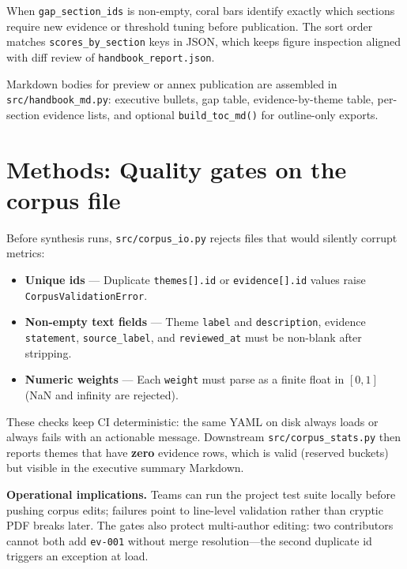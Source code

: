 \documentclass[
]{article}
\providecommand{\tightlist}{%
  \setlength{\itemsep}{0pt}\setlength{\parskip}{0pt}}
\begin{document}
When \texttt{gap\_section\_ids} is non-empty, coral bars identify
exactly which sections require new evidence or threshold tuning before
publication. The sort order matches \texttt{scores\_by\_section} keys in
JSON, which keeps figure inspection aligned with diff review of
\texttt{handbook\_report.json}.

Markdown bodies for preview or annex publication are assembled in
\texttt{src/handbook\_md.py}: executive bullets, gap table,
evidence-by-theme table, per-section evidence lists, and optional
\texttt{build\_toc\_md()} for outline-only exports.

\newpage

\section{Methods: Quality gates on the corpus
file}\label{methods-quality-gates-on-the-corpus-file}

Before synthesis runs, \texttt{src/corpus\_io.py} rejects files that
would silently corrupt metrics:

\begin{itemize}
\tightlist
\item
  \textbf{Unique ids} --- Duplicate \texttt{themes{[}{]}.id} or
  \texttt{evidence{[}{]}.id} values raise
  \texttt{CorpusValidationError}.
\item
  \textbf{Non-empty text fields} --- Theme \texttt{label} and
  \texttt{description}, evidence \texttt{statement},
  \texttt{source\_label}, and \texttt{reviewed\_at} must be non-blank
  after stripping.
\item
  \textbf{Numeric weights} --- Each \texttt{weight} must parse as a
  finite float in \([0, 1]\) (NaN and infinity are rejected).
\end{itemize}

These checks keep CI deterministic: the same YAML on disk always loads
or always fails with an actionable message. Downstream
\texttt{src/corpus\_stats.py} then reports themes that have
\textbf{zero} evidence rows, which is valid (reserved buckets) but
visible in the executive summary Markdown.

\textbf{Operational implications.} Teams can run the project test suite
locally before pushing corpus edits; failures point to line-level
validation rather than cryptic PDF breaks later. The gates also protect
multi-author editing: two contributors cannot both add \texttt{ev-001}
without merge resolution---the second duplicate id triggers an exception
at load.
\end{document}
